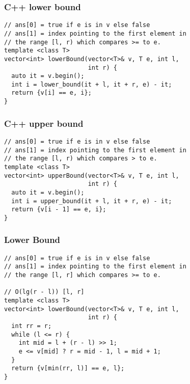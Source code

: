 \documentclass[twoside]{article}
\begin{document}
\begin{multicols*}{2}
\subsubsectionfont{\large\bfseries\sffamily\underline}
\subsubsection*{C++ lower bound}
\begin{verbatim}
// ans[0] = true if e is in v else false
// ans[1] = index pointing to the first element in
// the range [l, r) which compares >= to e.
template <class T>
vector<int> lowerBound(vector<T>& v, T e, int l,
                       int r) {
  auto it = v.begin();
  int i = lower_bound(it + l, it + r, e) - it;
  return {v[i] == e, i};
}
\end{verbatim}

\subsubsectionfont{\large\bfseries\sffamily\underline}
\subsubsection*{C++ upper bound}
\begin{verbatim}
// ans[0] = true if e is in v else false
// ans[1] = index pointing to the first element in
// the range [l, r) which compares > to e.
template <class T>
vector<int> upperBound(vector<T>& v, T e, int l,
                       int r) {
  auto it = v.begin();
  int i = upper_bound(it + l, it + r, e) - it;
  return {v[i - 1] == e, i};
}
\end{verbatim}

\subsubsectionfont{\large\bfseries\sffamily\underline}
\subsubsection*{Lower Bound}
\begin{verbatim}
// ans[0] = true if e is in v else false
// ans[1] = index pointing to the first element in
// the range [l, r] which compares >= to e.

// O(lg(r - l)) [l, r]
template <class T>
vector<int> lowerBound(vector<T>& v, T e, int l,
                       int r) {
  int rr = r;
  while (l <= r) {
    int mid = l + (r - l) >> 1;
    e <= v[mid] ? r = mid - 1, l = mid + 1;
  }
  return {v[min(rr, l)] == e, l};
}
\end{verbatim}

\subsubsectionfont{\large\bfseries\sffamily\underline}

\end{multicols*}
\end{document}
